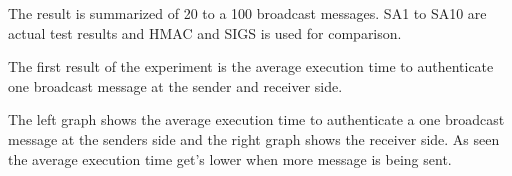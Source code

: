 \tiny
The result is summarized  of 20 to a 100 broadcast messages.  SA1 to SA10 are actual test results and HMAC and SIGS is used for comparison. 

The first result of the experiment is the average execution time to authenticate one broadcast message at the sender and receiver side. 

The left graph shows the average execution time to authenticate a one broadcast message at the senders side and the right graph shows the receiver side. As seen the average execution time get's lower when more message is being sent.